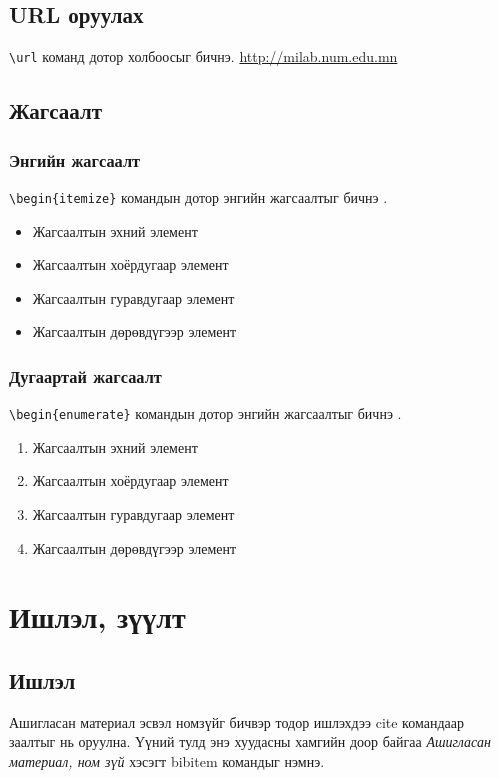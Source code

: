 \documentclass[12pt,A4]{report}
\begin{document}
\section{URL оруулах}
\texttt{\textbackslash url} команд дотор холбоосыг бичнэ. \url{http://milab.num.edu.mn}


\section{Жагсаалт}
\subsection{Энгийн жагсаалт}
\texttt{\textbackslash begin\{itemize\}} командын дотор энгийн жагсаалтыг бичнэ \cite{list}. 
\begin{itemize}
	\item Жагсаалтын эхний элемент
	\item Жагсаалтын хоёрдугаар элемент
	\item Жагсаалтын гуравдугаар элемент
	\item Жагсаалтын дөрөвдүгээр элемент
\end{itemize} 

\subsection{Дугаартай жагсаалт}
\texttt{\textbackslash begin\{enumerate\}} командын дотор энгийн жагсаалтыг бичнэ \cite{list}. 
\begin{enumerate}
	\item Жагсаалтын эхний элемент
	\item Жагсаалтын хоёрдугаар элемент
	\item Жагсаалтын гуравдугаар элемент
	\item Жагсаалтын дөрөвдүгээр элемент
\end{enumerate} 


\chapter{Ишлэл, зүүлт}
\section{Ишлэл}
Ашигласан материал эсвэл номзүйг бичвэр тодор ишлэхдээ cite командаар заалтыг нь оруулна. 
Үүний тулд энэ хуудасны хамгийн доор байгаа \textit{Ашигласан материал, ном зүй} хэсэгт 
bibitem командыг нэмнэ. \\
\end{document}
